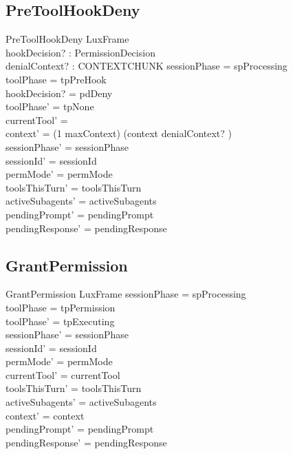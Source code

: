 \documentclass[a4paper,10pt,fleqn]{article}
\begin{document}
\subsection{PreToolHookDeny}

\begin{schema}{PreToolHookDeny}
  LuxFrame \\
  hookDecision? : PermissionDecision \\
  denialContext? : CONTEXTCHUNK
  \where
  sessionPhase = spProcessing \\
  toolPhase = tpPreHook \\
  hookDecision? = pdDeny \\
  toolPhase' = tpNone \\
  currentTool' = \emptyset \\
  context' = (1 \upto maxContext) \dres (context \cat \langle denialContext? \rangle) \\
  sessionPhase' = sessionPhase \\
  sessionId' = sessionId \\
  permMode' = permMode \\
  toolsThisTurn' = toolsThisTurn \\
  activeSubagents' = activeSubagents \\
  pendingPrompt' = pendingPrompt \\
  pendingResponse' = pendingResponse
\end{schema}

\subsection{GrantPermission}

\begin{schema}{GrantPermission}
  LuxFrame
  \where
  sessionPhase = spProcessing \\
  toolPhase = tpPermission \\
  toolPhase' = tpExecuting \\
  sessionPhase' = sessionPhase \\
  sessionId' = sessionId \\
  permMode' = permMode \\
  currentTool' = currentTool \\
  toolsThisTurn' = toolsThisTurn \\
  activeSubagents' = activeSubagents \\
  context' = context \\
  pendingPrompt' = pendingPrompt \\
  pendingResponse' = pendingResponse
\end{schema}
\end{document}
